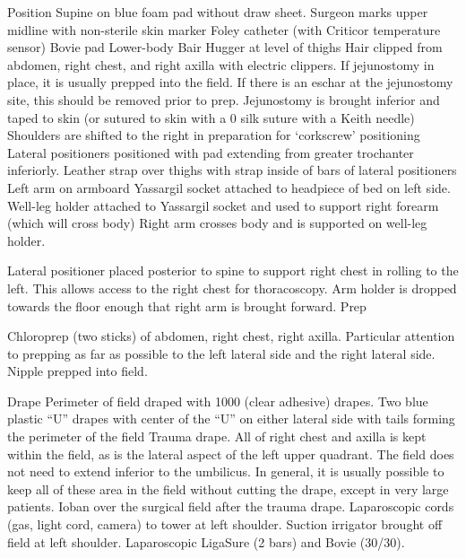 \documentclass[
]{book}
\begin{document}
Position
Supine on blue foam pad without draw sheet. Surgeon marks upper midline with non-sterile skin marker Foley catheter (with Criticor temperature sensor) Bovie pad Lower-body Bair Hugger at level of thighs Hair clipped from abdomen, right chest, and right axilla with electric clippers. If jejunostomy in place, it is usually prepped into the field. If there is an eschar at the jejunostomy site, this should be removed prior to prep. Jejunostomy is brought inferior and taped to skin (or sutured to skin with a 0 silk suture with a Keith needle) Shoulders are shifted to the right in preparation for `corkscrew' positioning Lateral positioners positioned with pad extending from greater trochanter inferiorly. Leather strap over thighs with strap inside of bars of lateral positioners Left arm on armboard Yassargil socket attached to headpiece of bed on left side. Well-leg holder attached to Yassargil socket and used to support right forearm (which will cross body) Right arm crosses body and is supported on well-leg holder.

Lateral positioner placed posterior to spine to support right chest in rolling to the left. This allows access to the right chest for thoracoscopy. Arm holder is dropped towards the floor enough that right arm is brought forward. Prep

Chloroprep (two sticks) of abdomen, right chest, right axilla. Particular attention to prepping as far as possible to the left lateral side and the right lateral side. Nipple prepped into field.

Drape
Perimeter of field draped with 1000 (clear adhesive) drapes. Two blue plastic ``U'' drapes with center of the ``U'' on either lateral side with tails forming the perimeter of the field Trauma drape. All of right chest and axilla is kept within the field, as is the lateral aspect of the left upper quadrant. The field does not need to extend inferior to the umbilicus. In general, it is usually possible to keep all of these area in the field without cutting the drape, except in very large patients. Ioban over the surgical field after the trauma drape. Laparoscopic cords (gas, light cord, camera) to tower at left shoulder. Suction irrigator brought off field at left shoulder. Laparoscopic LigaSure (2 bars) and Bovie (30/30).
\end{document}
